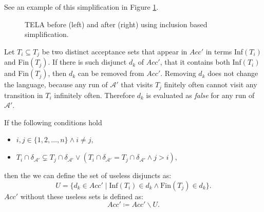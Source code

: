 \documentclass[
  digital, %
  twoside, %
  table,   %
  lof,     %
  lot,     %
]{fithesis3}
\begin{document}
See an example of this simplification in Figure \ref{fig:inclusion_fins}.

\begin{figure}[h]
  \centering
  \caption{TELA before (left) and after (right) using inclusion based simplification.}
  \label{fig:inclusion_fins}
\end{figure}

Let $T_i \subseteq T_j$ be two distinct acceptance sets that appear in $Acc'$ in terms Inf$(T_i)$ and Fin$(T_j)$. If there is such disjunct $d_k$ of $Acc'$, that it contains both Inf$(T_i)$ and Fin$(T_j)$, then $d_k$ can be removed from $Acc'$. Removing $d_k$ does not change the language, because any run of $\mathcal{A'}$ that visits $T_j$ finitely often cannot visit any transition in $T_i$ infinitely often. Therefore $d_k$ is evaluated as \emph{false} for any run of $\mathcal{A'}$. 

If the following conditions hold
\begin{itemize}
  \item $i, j \in \{1, 2, \dots, n\} \wedge i \neq j$,
  \item $T_i \cap \delta_{\mathcal{A'}} \subsetneq T_j \cap \delta_{\mathcal{A'}} \vee (T_i \cap \delta_{\mathcal{A'}} = T_j \cap \delta_{\mathcal{A'}} \wedge j > i)$,
\end{itemize}
then the we can define the set of useless disjuncts as:
\begin{equation*}
  U = \{d_k \in Acc' \mid \text{Inf}(T_i) \in d_k \wedge \text{Fin}(T_j) \in d_k \}.
\end{equation*}
$Acc'$ without these useless sets is defined as:
\begin{equation*}
  Acc' \coloneqq Acc' \smallsetminus U.
\end{equation*}
\end{document}
